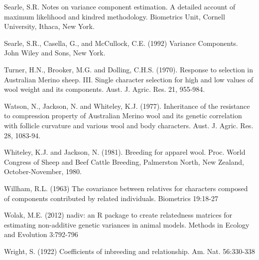 \documentclass[titlepage]{article}  %
\begin{document}
\begin{thebibliography}{99}
Searle, S.R. Notes on variance component estimation. A detailed account of 
    maximum likelihood and kindred methodology. Biometrics Unit, Cornell
    University, Ithaca, New York.

Searle, S.R., Casella, G., and McCullock, C.E. (1992) Variance Components.
    John Wiley and Sons, New York.

Turner, H.N., Brooker, M.G. and Dolling, C.H.S. (1970).  Response to
    selection in Australian Merino sheep. III.  Single character selection
    for high and low values of wool weight and its components.  Aust. J.
    Agric. Res. 21, 955-984.

Watson, N., Jackson, N. and Whiteley, K.J. (1977).  Inheritance of the
    resistance to compression property of Australian Merino wool and its
    genetic correlation with follicle curvature and various wool and body
    characters.  Aust. J. Agric. Res. 28, 1083-94.

Whiteley, K.J. and Jackson, N. (1981).  Breeding for apparel wool.  Proc.
    World Congress of Sheep and Beef Cattle Breeding, Palmerston North, New
    Zealand, October-November, 1980.

Willham, R.L. (1963) The covariance between relatives for characters composed
    of components contributed by related individuals. Biometrics 19:18-27

Wolak, M.E. (2012) nadiv: an R package to create relatedness matrices for
    estimating non-additive genetic variances in animal models. 
    Methods in Ecology and Evolution 3:792-796

Wright, S. (1922) Coefficients of inbreeding and relationship. 
    Am. Nat. 56:330-338

\end{thebibliography}
\end{document}

